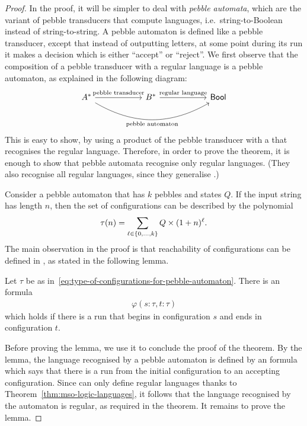 \begin{proof}
    In the proof, it will be simpler to deal with \emph{pebble automata}, which are the variant of pebble transducers that compute languages, i.e.~string-to-Boolean instead of string-to-string. A pebble automaton is defined like a pebble transducer, except that instead of outputting letters, at some point during its run it makes a decision which is either ``accept'' or ``reject''.
    We first observe that the composition of  a pebble transducer with a regular language is a pebble automaton, as explained in the following diagram:
    \[
    \begin{tikzcd}[column sep=2cm]
    A^*
    \ar[r,"\text{pebble transducer}"]
    \ar[rr,bend right, "\text{pebble automaton}"']
    &
    B^*
    \ar[r,"\text{regular language}"]
    &
    \Bool
    \end{tikzcd}
    \]
    This is easy to show, by using a product of the pebble transducer with a \dfa that recognises the regular language. Therefore, in order to prove the theorem, it is enough to show that pebble automata recognise only regular languages. (They also recognise all regular languages, since they generalise \dfa.) 
 
    Consider a pebble automaton that has $k$ pebbles and states $Q$. If the input string has length $n$, then the set of configurations can be described by the polynomial
    \begin{align}
        \label{eq:type-of-configurations-for-pebble-automaton}
    \tau(n) = \sum_{\ell \in \{0,\ldots,k\}} Q \times (1+n)^\ell.
    \end{align}
    The main observation in the proof is that reachability of configurations can be defined in \mso, as stated in the following lemma.
    \begin{lemma}\label{lem:reachability-pebble-automaton}
        Let $\tau$ be as in~\eqref{eq:type-of-configurations-for-pebble-automaton}. There is an \mso formula 
    \begin{align*}
    \varphi(s: \tau, t : \tau)
    \end{align*}
    which holds if there is a run that begins in configuration $s$ and ends in configuration $t$.
    \end{lemma}
    

    Before proving the lemma, we use it to conclude the proof of the theorem. By the lemma, the language recognised by a pebble automaton  is defined by an \mso formula which  says that there is a run from the initial configuration to an accepting configuration. Since  \mso can only define regular languages thanks to Theorem~\ref{thm:mso-logic-languages}, it follows that the language recognised by the automaton is regular, as required in the theorem. It remains to prove the lemma.







\end{proof}
